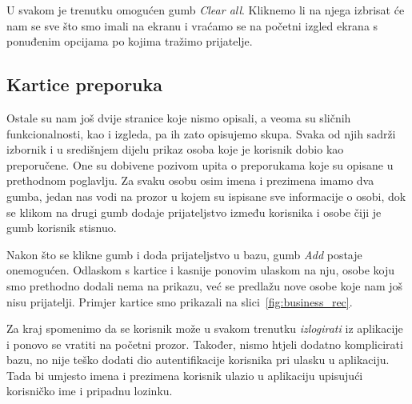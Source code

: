 \documentclass[titlepage, 12pt]{scrartcl}
\begin{document}
	U svakom je trenutku omogućen gumb \emph{Clear all}. Kliknemo li na njega izbrisat će nam se sve što smo imali na ekranu i vraćamo se na početni izgled ekrana s ponuđenim opcijama po kojima tražimo prijatelje.
	
	
	\subsection{Kartice preporuka}
	
	Ostale su nam još dvije stranice koje nismo opisali, a veoma su sličnih funkcionalnosti, kao i izgleda, pa ih zato opisujemo skupa. Svaka od njih sadrži izbornik i u središnjem dijelu prikaz osoba koje je korisnik dobio kao preporučene. One su dobivene pozivom upita o preporukama koje su opisane u prethodnom poglavlju. Za svaku osobu osim imena i prezimena imamo dva gumba, jedan nas vodi na prozor u kojem su ispisane sve informacije o osobi, dok se klikom na drugi gumb dodaje prijateljstvo između korisnika i osobe čiji je gumb korisnik stisnuo.
	
	Nakon što se klikne gumb i doda prijateljstvo u bazu, gumb \emph{Add} postaje onemogućen. Odlaskom s kartice i kasnije ponovim ulaskom na nju, osobe koju smo prethodno dodali nema na prikazu, već se predlažu nove osobe koje nam još nisu prijatelji. Primjer kartice smo prikazali na slici~\ref{fig:business_rec}.
	
	Za kraj spomenimo da se korisnik može u svakom trenutku \emph{izlogirati} iz aplikacije i ponovo se vratiti na početni prozor. Također, nismo htjeli dodatno komplicirati bazu, no nije teško dodati dio autentifikacije korisnika pri ulasku u aplikaciju. Tada bi umjesto imena i prezimena korisnik ulazio u aplikaciju upisujući korisničko ime i pripadnu lozinku. 
	
\end{document}
